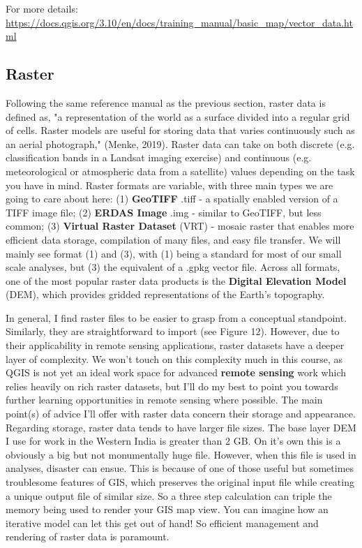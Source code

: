 \documentclass{article}
\begin{document}
For more details: \url{https://docs.qgis.org/3.10/en/docs/training_manual/basic_map/vector_data.html}

\subsection{Raster}

Following the same reference manual as the previous section, raster data is defined as, "a representation of the world as a surface divided into a regular grid of cells. Raster models are useful for storing data that varies continuously such as an aerial photograph," (Menke, 2019). Raster data can take on both discrete (e.g. classification bands in a Landsat imaging exercise) and continuous (e.g. meteorological or atmospheric data from a satellite) values depending on the task you have in mind. Raster formats are variable, with three main types we are going to care about here: (1) \textbf{GeoTIFF} .tiff - a spatially enabled version of a TIFF image file; (2) \textbf{ERDAS Image} .img - similar to GeoTIFF, but less common; (3) \textbf{Virtual Raster Dataset} (VRT) - mosaic raster that enables more efficient data storage, compilation of many files, and easy file transfer. We will mainly see format (1) and (3), with (1) being a standard for most of our small scale analyses, but (3) the equivalent of a .gpkg vector file. Across all formats, one of the most popular raster data products is the \textbf{Digital Elevation Model} (DEM), which provides gridded representations of the Earth's topography. 

In general, I find raster files to be easier to grasp from a conceptual standpoint. Similarly,  they are straightforward to import (see Figure 12). However, due to their applicability in remote sensing applications, raster datasets have a deeper layer of complexity. We won't touch on this complexity much in this course, as QGIS is not yet an ideal work space for advanced \textbf{remote sensing} work which relies heavily on rich raster datasets, but I'll do my best to point you towards further learning opportunities in remote sensing where possible. The main point(s) of advice I'll offer with raster data concern their storage and appearance. Regarding storage, raster data tends to have larger file sizes. The base layer DEM I use for work in the Western India is greater than 2 GB. On it's own this is a obviously a big but not monumentally huge file. However, when this file is used in analyses, disaster can ensue. This is because of one of those useful but sometimes troublesome features of GIS, which preserves the original input file while creating a unique output file of similar size. So a three step calculation can triple the memory being used to render your GIS map view. You can imagine how an iterative model can let this get out of hand! So efficient management and rendering of raster data is paramount. 
\end{document}

